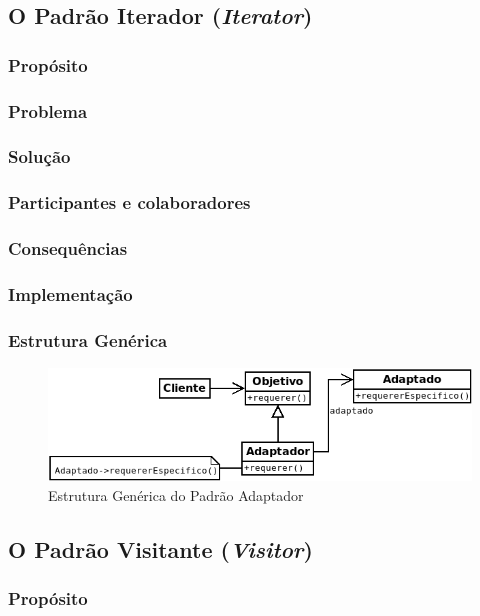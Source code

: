 \subsection{O Padrão Iterador (\textit{Iterator})}
\subsubsection{Propósito}
\subsubsection{Problema}
\subsubsection{Solução}
\subsubsection{Participantes e colaboradores}
\subsubsection{Consequências}
\subsubsection{Implementação}
\subsubsection{Estrutura Genérica}

\begin{figure}[h]
\begin{center}
\includegraphics[scale=0.6]{adaptador.png}
\caption{Estrutura Genérica do Padrão Adaptador}\label{fig:adaptador}
\end{center}
\end{figure}

\subsection{O Padrão Visitante (\textit{Visitor})}
\subsubsection{Propósito}
